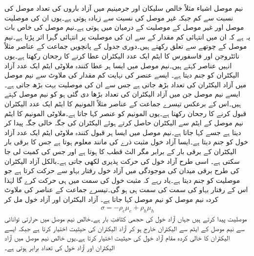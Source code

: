 نیم موصل اشیاء مثلاً خالص سلیکان اور جرمینیم میں آزاد باروں کی تعداد موصل کی نسبت سے کم جبکہ غیر موصل کی نسبت سے زیادہ ہوتی ہے۔یوں ان کی موصلیت موصل اور غیر موصل کے موصلیت کے درمیان میں ہوتی ہے۔نیم موصل کی خاص بات یہ ہے کہ ان میں انتہائی کم مقدار کے  سے ان کی موصلیت پر انتہائی گہرا اثر پڑتا ہے۔نیم موصل  کے چوتھے   سے تعلق رکھتے ہیں۔دوری جدول کے پانچویں جماعت کے عناصر مثلاً  نائٹروجن اور فاسفورس کا ایٹم ایک عدد الیکٹران عطا کرنے کا رجحان رکھتا ہے۔یوں انہیں  عناصر کہتے ہیں۔نیم موصل میں ایسا ہر عطا کنندہ ملاوٹی ایٹم ایک عدد آزاد الیکٹران کو جنم دیتا ہے۔ ایسے عنصر کی نہایت کم مقدار کی ملاوٹ سے نیم موصل میں آزاد الیکٹران کی تعداد بڑھ جاتی ہے جس سے ان کی موصلیت بہت بڑھ جاتی ہے۔ایسے نیم موصل جن میں آزاد الیکٹران کی تعداد بڑھا دی گئی ہو کو  نیم موصل کہتے ہیں۔اس کے برعکس تیسرے جماعت کے عناصر مثلاً المونیم کا ایٹم ایک عدد الیکٹران قبول کرنے کا رجحان رکھتا ہے۔یوں المونیم کو  عنصر کہا جاتا ہے۔ملاوٹی المونیم کا ایٹم نیم موصل کے ایٹم سے الیکٹران حاصل کرتے ہوئے  الیکٹران کی جگہ خالی جگہ پیدا کر دیتا ہے جسے  کہا جاتا ہے۔نیم موصل میں ایسا ہر قبول کنندہ ملاوٹی ایٹم ایک عدد آزاد خول کو جنم دیتا ہے۔ایسا آزاد خول مثبت ذرے کی مانند معلوم ہوتا ہے جس کا برقی بار  الیکٹران کے  برقی بار  کے برابر مگر الٹ قطب کا ہوتا ہے اور جس کی کمیت  لی جا سکتی ہے۔ اسی طرح آزاد خول کی حرکت پذیری  لکھی جاتی ہے۔بالکل آزاد الیکٹران کی طرح برقی میدان کی موجودگی میں آزاد خول رفتار بہاو  سے حرکت کرتا ہے جو موصلیت   کو جنم دیتا ہے۔یاد رہے کہ مثبت خول  کی سمت میں ہی حرکت کرے گا لہٰذا اس کے رفتار بہاو کی سمت  کی سمت ہی ہو گی۔تیسرے جماعت کے عناصر کی ملاوٹ کردہ نیم موصل کو  نیم موصل کہا جاتا ہے۔
آزاد الیکٹران اور آزاد خول مل کر 
\begin{align}
\sigma =-\rho_e \mu_e+\rho_h \mu_h
\end{align} 
موصلیت پیدا کرتے ہیں جہاں  آزاد خول کی حجمی کثافتِ بار ہے۔خالص نیم موصل میں حرارتی توانائی سے نیم موصل کے ایٹم سے الیکٹران خارج ہو کر آزاد الیکٹران کی حیثیت اختیار کرتا ہے جبکہ ایسے الیکٹران کا خالی کردہ مقام آزاد خول کی حیثیت اختیار کرتا ہے۔یوں خالص نیم موصل میں آزاد الیکٹران اور آزاد خول کی تعداد برابر ہوتی ہے۔


